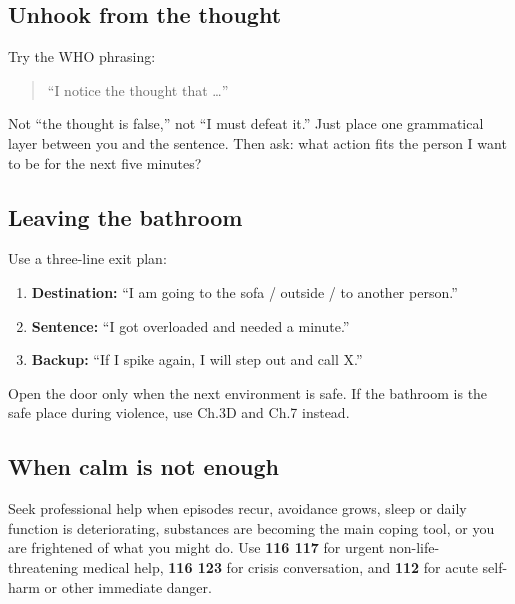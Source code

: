 \hypertarget{unhook-from-the-thought}{%
\subsection{Unhook from the thought}\label{unhook-from-the-thought}}

Try the WHO phrasing:

\begin{quote}
``I notice the thought that \ldots{}''
\end{quote}

Not ``the thought is false,'' not ``I must defeat it.'' Just place one
grammatical layer between you and the sentence. Then ask: what action
fits the person I want to be for the next five minutes?

\hypertarget{leaving-the-bathroom}{%
\subsection{Leaving the bathroom}\label{leaving-the-bathroom}}

Use a three-line exit plan:

\begin{enumerate}
\def\labelenumi{\arabic{enumi}.}
\tightlist
\item
  \textbf{Destination:} ``I am going to the sofa / outside / to another
  person.''
\item
  \textbf{Sentence:} ``I got overloaded and needed a minute.''
\item
  \textbf{Backup:} ``If I spike again, I will step out and call X.''
\end{enumerate}

Open the door only when the next environment is safe. If the bathroom is
the safe place during violence, use Ch.3D and Ch.7 instead.

\hypertarget{when-calm-is-not-enough}{%
\subsection{When calm is not enough}\label{when-calm-is-not-enough}}

Seek professional help when episodes recur, avoidance grows, sleep or
daily function is deteriorating, substances are becoming the main coping
tool, or you are frightened of what you might do. Use \textbf{116 117}
for urgent non-life- threatening medical help, \textbf{116 123} for
crisis conversation, and \textbf{112} for acute self-harm or other
immediate danger.

